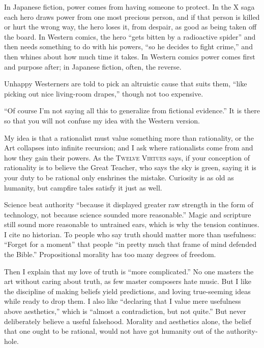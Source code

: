 
In Japanese fiction, power comes from having someone to protect. In the \textsc{X} saga each hero draws power from one most precious person, and if that person is killed or hurt the wrong way, the hero loses it, from despair, as good as being taken off the board. In Western comics, the hero ``gets bitten by a radioactive spider'' and then needs something to do with his powers, ``so he decides to fight crime,'' and then whines about how much time it takes. In Western comics power comes first and purpose after; in Japanese fiction, often, the reverse. 

Unhappy Westerners are told to pick an altruistic cause that suits them, ``like picking out nice living-room drapes,'' though not too expensive.

``Of course I'm not saying all this to generalize from fictional evidence.'' It is there so that you will not confuse my idea with the Western version.

My idea is that a rationalist must value something more than rationality, or the Art collapses into infinite recursion; and I ask where rationalists come from and how they gain their powers. As the \textsc{Twelve Virtues} says, if your conception of rationality is to believe the Great Teacher, who says the sky is green, saying it is your duty to be rational only enshrines the mistake. Curiosity is as old as humanity, but campfire tales satisfy it just as well.

Science beat authority ``because it displayed greater raw strength in the form of technology, not because science sounded more reasonable.'' Magic and scripture still sound more reasonable to untrained ears, which is why the tension continues. I cite no historian.  To people who say truth should matter more than usefulness: ``Forget for a moment'' that people ``in pretty much that frame of mind defended the Bible.''  Propositional morality has too many degrees of freedom.

Then I explain that my love of truth is ``more complicated.'' No one masters the art without caring about truth, as few master composers hate music. But I like the discipline of making beliefs yield predictions, and loving true-seeming ideas while ready to drop them. I also like ``declaring that I value mere usefulness above aesthetics,'' which is ``almost a contradiction, but not quite.'' But never deliberately believe a useful falsehood. Morality and aesthetics alone, the belief that one ought to be rational, would not have got humanity out of the authority-hole.

